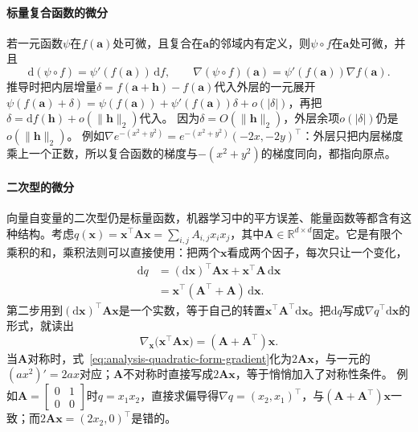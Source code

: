 \paragraph{标量复合函数的微分}
若一元函数$\psi$在$f(\bm a)$处可微，且复合在$\bm a$的邻域内有定义，则$\psi\circ f$在$\bm a$处可微，并且
\[
 \mathrm d(\psi\circ f)=\psi'(f(\bm a))\,\mathrm df,
 \qquad
 \nabla(\psi\circ f)(\bm a)=\psi'(f(\bm a))\nabla f(\bm a).
\]
推导时把内层增量$\delta=f(\bm a+\bm h)-f(\bm a)$代入外层的一元展开$\psi(f(\bm a)+\delta)=\psi(f(\bm a))+\psi'(f(\bm a))\delta+o(|\delta|)$，再把$\delta=\mathrm df(\bm h)+o(\lVert\bm h\rVert_2)$代入。
因为$\delta=O(\lVert\bm h\rVert_2)$，外层余项$o(|\delta|)$仍是$o(\lVert\bm h\rVert_2)$。
例如$\nabla e^{-(x^2+y^2)}=e^{-(x^2+y^2)}(-2x,-2y)^\top$：外层只把内层梯度乘上一个正数，所以复合函数的梯度与$-(x^2+y^2)$的梯度同向，都指向原点。

\paragraph{二次型的微分}
向量自变量的二次型仍是标量函数，机器学习中的平方误差、能量函数等都含有这种结构。考虑$q(\bm{x})=\bm{x}^{\top}\bm{A}\bm{x}=\sum_{i,j}A_{i,j}x_ix_j$，其中$\bm{A}\in\mathbb{R}^{d\times d}$固定。它是有限个乘积的和，乘积法则可以直接使用：把两个$\bm x$看成两个因子，每次只让一个变化，
\begin{align*}
  \mathrm{d}q
  &=
  (\mathrm{d}\bm{x})^{\top}\bm{A}\bm{x}
  +\bm{x}^{\top}\bm{A}\,\mathrm{d}\bm{x}\\
  &=
  \bm{x}^{\top}(\bm{A}^{\top}+\bm{A})\,\mathrm{d}\bm{x}.
\end{align*}
第二步用到$(\mathrm d\bm x)^\top\bm A\bm x$是一个实数，等于自己的转置$\bm x^\top\bm A^\top\mathrm d\bm x$。把$\mathrm dq$写成$\nabla q^\top\mathrm d\bm x$的形式，就读出
\begin{equation}
  \nabla_{\bm{x}}
  \bigl(\bm{x}^{\top}\bm{A}\bm{x}\bigr)
  =
  (\bm{A}+\bm{A}^{\top})\bm{x}.
\label{eq:analysis-quadratic-form-gradient}
\end{equation}
当$\bm{A}$对称时，式~\eqref{eq:analysis-quadratic-form-gradient}化为$2\bm{A}\bm{x}$，与一元的$(ax^2)'=2ax$对应；$\bm A$不对称时直接写成$2\bm{A}\bm{x}$，等于悄悄加入了对称性条件。
例如$\bm A=\begin{bmatrix}0&1\\0&0\end{bmatrix}$时$q=x_1x_2$，直接求偏导得$\nabla q=(x_2,x_1)^\top$，与$(\bm A+\bm A^\top)\bm x$一致；而$2\bm A\bm x=(2x_2,0)^\top$是错的。

